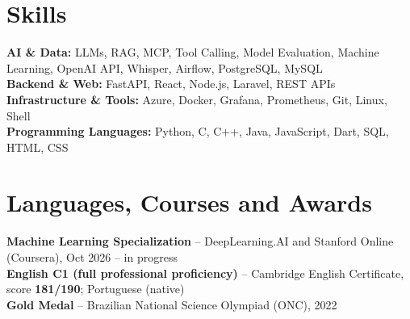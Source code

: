 \documentclass[10pt,a4paper]{article}
\begin{document}
\section*{Skills}

\textbf{AI \& Data:}
LLMs, RAG, MCP, Tool Calling, Model Evaluation, Machine Learning, OpenAI API, Whisper,
Airflow, PostgreSQL, MySQL\\
\textbf{Backend \& Web:}
FastAPI, React, Node.js, Laravel, REST APIs\\
\textbf{Infrastructure \& Tools:}
Azure, Docker, Grafana, Prometheus, Git, Linux, Shell\\
\textbf{Programming Languages:}
Python, C, C++, Java, JavaScript, Dart, SQL, HTML, CSS

\section*{Languages, Courses and Awards}

\textbf{Machine Learning Specialization} -- DeepLearning.AI and Stanford Online (Coursera), Oct 2026 -- in progress\\
\textbf{English C1 (full professional proficiency)} -- Cambridge English Certificate, score \textbf{181/190}; Portuguese (native)\\
\textbf{Gold Medal} -- Brazilian National Science Olympiad (ONC), 2022
\end{document}
